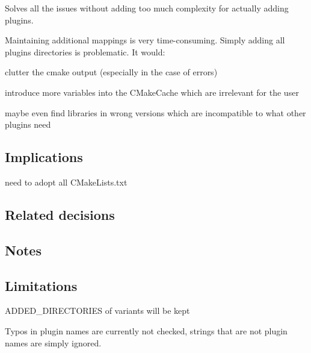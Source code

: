 Solves all the issues without adding too much complexity for actually adding plugins.

Maintaining additional mappings is very time-\/consuming. Simply adding all plugins directories is problematic. It would\+:


\begin{DoxyItemize}
\item clutter the cmake output (especially in the case of errors)
\item introduce more variables into the C\+Make\+Cache which are irrelevant for the user
\item maybe even find libraries in wrong versions which are incompatible to what other plugins need
\end{DoxyItemize}

\subsection*{Implications}


\begin{DoxyItemize}
\item need to adopt all C\+Make\+Lists.\+txt
\end{DoxyItemize}

\subsection*{Related decisions}

\subsection*{Notes}

\subsection*{Limitations}


\begin{DoxyItemize}
\item {\ttfamily A\+D\+D\+E\+D\+\_\+\+D\+I\+R\+E\+C\+T\+O\+R\+I\+ES} of variants will be kept
\item Typos in plugin names are currently not checked, strings that are not plugin names are simply ignored. 
\end{DoxyItemize}